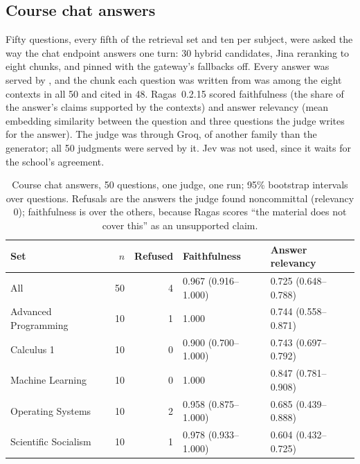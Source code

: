 \subsection{Course chat answers}\label{sec:results-chat}
Fifty questions, every fifth of the retrieval set and ten per subject, were asked the way the chat endpoint answers one turn: 30 hybrid candidates, Jina reranking to eight chunks, and  pinned with the gateway's fallbacks off. Every answer was served by , and the chunk each question was written from was among the eight contexts in all 50 and cited in 48. Ragas~0.2.15 scored faithfulness (the share of the answer's claims supported by the contexts) and answer relevancy (mean embedding similarity between the question and three questions the judge writes for the answer). The judge was  through Groq, of another family than the generator; all 50 judgments were served by it. Jev was not used, since it waits for the school's agreement.
\begin{table}[H]\centering\small\caption{Course chat answers, 50 questions, one judge, one run; 95\% bootstrap intervals over questions. Refusals are the answers the judge found noncommittal (relevancy 0); faithfulness is over the others, because Ragas scores ``the material does not cover this'' as an unsupported claim.}\label{tab:chat-ragas}
\begin{tabularx}{\linewidth}{|Y|r|r|l|l|}\hline
Set & $n$ & Refused & Faithfulness & Answer relevancy\\\hline
All & 50 & 4 & 0.967 (0.916--1.000) & 0.725 (0.648--0.788)\\\hline
Advanced Programming & 10 & 1 & 1.000 & 0.744 (0.558--0.871)\\\hline
Calculus 1 & 10 & 0 & 0.900 (0.700--1.000) & 0.743 (0.697--0.792)\\\hline
Machine Learning & 10 & 0 & 1.000 & 0.847 (0.781--0.908)\\\hline
Operating Systems & 10 & 2 & 0.958 (0.875--1.000) & 0.685 (0.439--0.888)\\\hline
Scientific Socialism & 10 & 1 & 0.978 (0.933--1.000) & 0.604 (0.432--0.725)\\\hline
\end{tabularx}\end{table}
